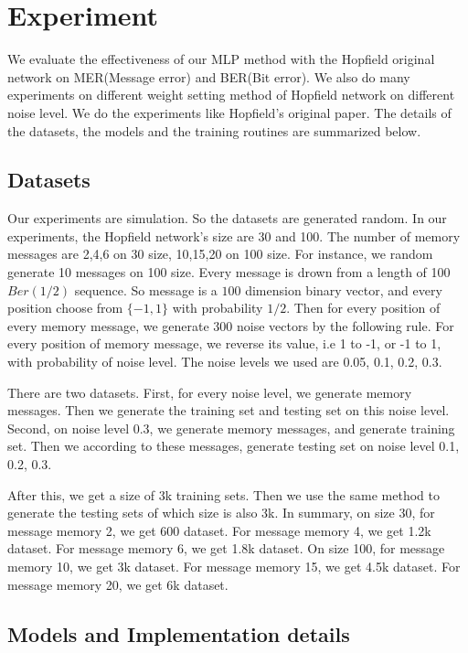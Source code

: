
\section{Experiment}

We evaluate the effectiveness of our MLP method with the Hopfield original network on MER(Message error) and BER(Bit error). We also do many experiments on different weight setting method of Hopfield network on different noise level. We do the experiments like Hopfield's original paper. The details of the datasets, the models and the training routines are summarized below.

\subsection{Datasets}

Our experiments are simulation. So the datasets are generated random. In our experiments, the Hopfield network's size are 30 and 100. The number of memory messages are 2,4,6 on 30 size, 10,15,20 on 100 size. For instance, we random generate 10 messages on 100 size. Every message is drown from a length of 100 $Ber(1/2)$ sequence. So message is a $100$ dimension binary vector, and every position choose from $\{-1, 1\}$ with probability $1/2$. Then for every position of every memory message, we generate 300 noise vectors by the following rule. For every position of memory message, we reverse its value, i.e 1 to -1, or -1 to 1, with probability of noise level. The noise levels we used are 0.05, 0.1, 0.2, 0.3.

There are two datasets. First, for every noise level, we generate memory messages. Then we generate the training set and testing set on this noise level. Second, on noise level 0.3, we generate memory messages, and generate training set. Then we according to these messages, generate testing set on noise level 0.1, 0.2, 0.3.

After this, we get a size of 3k training sets. Then we use the same method to generate the testing sets of which size is also 3k. In summary, on size 30, for message memory 2, we get 600 dataset. For message memory 4, we get 1.2k dataset. For message memory 6, we get 1.8k dataset. On size 100, for message memory 10, we get 3k dataset. For message memory 15, we get 4.5k dataset. For message memory 20, we get 6k dataset.

\subsection{Models and Implementation details}
